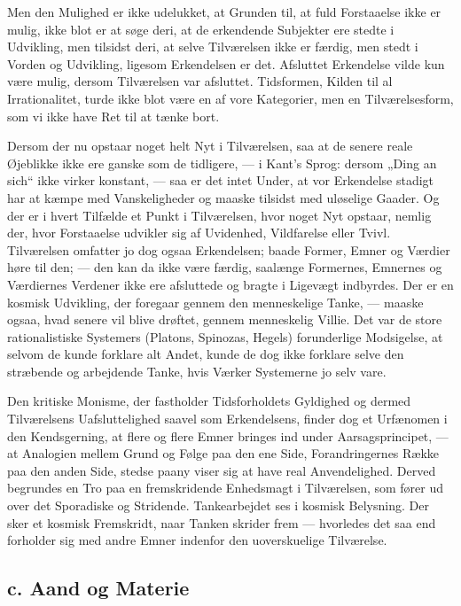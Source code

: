 \documentclass[12pt,a4paper]{book}
\newcommand{\opage}[1]{\marginnote{\footnotesize\textit{[#1]}}}
\newcommand{\apage}[1]{\marginnote{\footnotesize\textit{[#1]}}}
\begin{document}
Men den Mulighed er ikke udelukket, at Grunden til, at fuld Forstaaelse ikke er mulig,
ikke blot er at søge deri, at de erkendende Subjekter ere stedte i Udvikling, men tilsidst
deri, at selve Tilværelsen ikke er færdig, men stedt i \apage{328} Vorden og Udvikling, ligesom
Erkendelsen er det. Afsluttet Erkendelse vilde kun være mulig, dersom Tilværelsen var
afsluttet. Tidsformen, Kilden til al Irrationalitet, turde ikke blot være en af vore
Kategorier, men en Tilværelsesform, som vi ikke have Ret til at tænke bort.

Dersom der nu opstaar noget helt Nyt i Tilværelsen, saa at de senere reale Øjeblikke ikke
ere ganske som de tidligere, --- i Kant's Sprog: dersom „Ding an sich“ ikke virker
konstant, --- saa er det intet Under, at vor Erkendelse stadigt har at kæmpe med
Vanskeligheder og maaske tilsidst med uløselige Gaader. Og der er i hvert Tilfælde et
Punkt i Tilværelsen, hvor noget Nyt opstaar, nemlig der, hvor Forstaaelse udvikler sig af
Uvidenhed, Vildfarelse eller Tvivl. Tilværelsen omfatter jo dog ogsaa Erkendelsen; baade
Former, Emner og Værdier høre til den; --- den kan da ikke være færdig, saalænge
Formernes, Emnernes og Værdiernes Verdener ikke ere afsluttede og bragte i Ligevægt indbyrdes.
Der er en kosmisk Udvikling, der foregaar gennem den menneskelige Tanke, --- maaske ogsaa,
hvad senere vil blive drøftet, gennem menneskelig Villie. Det var de store rationalistiske
Systemers (Platons, Spinozas, Hegels) forunderlige Modsigelse, at selvom de kunde forklare
alt Andet, kunde de dog ikke forklare selve den stræbende og arbejdende Tanke, hvis
Værker Systemerne jo selv vare.

Den kritiske Monisme, der fastholder Tidsforholdets Gyldighed og dermed Tilværelsens
Uafsluttelighed saavel som Erkendelsens, finder dog et Urfænomen i den Kendsgerning, at
flere og flere Emner bringes ind under Aarsagsprincipet, --- at Analogien mellem Grund og Følge paa den ene Side, Forandringernes Række paa den anden Side, stedse paany viser sig
at have real Anvendelighed. Derved begrundes en Tro paa en fremskridende Enhedsmagt i
Tilværelsen, som fører ud over det Sporadiske og Stridende. Tankearbejdet ses i kosmisk
Belysning. Der sker et kosmisk Fremskridt, naar Tanken skrider frem --- hvorledes det saa
end forholder sig med andre Emner indenfor den uoverskuelige Tilværelse.

\opage{329} \subsection*{c. Aand og Materie}
\end{document}
